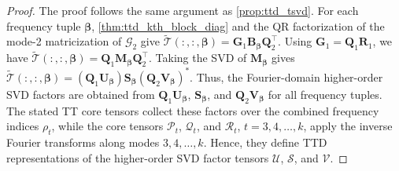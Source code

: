 \documentclass[onefignum,onetabnum]{siamart250211}
\begin{document}
\begin{proof}
The proof follows the same argument as \cref{prop:ttd_tsvd}.
For each frequency tuple $\boldsymbol{\beta}$, \cref{thm:ttd_kth_block_diag}
and the QR factorization of the mode-2 matricization of $\mathscr{G}_2$ give
$\widetilde{\mathscr{T}}(:,:, \boldsymbol{\beta})
=
\textbf{G}_1\textbf{B}_{\boldsymbol{\beta}}\textbf{Q}_2^\top.$
Using $\textbf{G}_1=\textbf{Q}_1\textbf{R}_1$, we have $\widetilde{\mathscr{T}}(:,:, \boldsymbol{\beta})
=
\textbf{Q}_1\textbf{M}_{\boldsymbol{\beta}}\textbf{Q}_2^\top.$
Taking the SVD of $\textbf{M}_{\boldsymbol{\beta}}$ gives $\widetilde{\mathscr{T}}(:,:, \boldsymbol{\beta})
=
(\textbf{Q}_1\textbf{U}_{\boldsymbol{\beta}})
\boldsymbol{S}_{\boldsymbol{\beta}}
(\textbf{Q}_2\textbf{V}_{\boldsymbol{\beta}})^*.$
Thus, the Fourier-domain higher-order SVD factors are obtained from
$\textbf{Q}_1\textbf{U}_{\boldsymbol{\beta}}$,
$\boldsymbol{S}_{\boldsymbol{\beta}}$, and
$\textbf{Q}_2\textbf{V}_{\boldsymbol{\beta}}$ for all frequency tuples. The stated TT core tensors collect these factors over the combined frequency indices $\rho_t$, while the core tensors $\mathscr{P}_t$, $\mathscr{Q}_t$, and $\mathscr{R}_t$, $t=3,4,\dots,k$, apply the inverse Fourier transforms along modes $3, 4, \dots,k$. Hence, they define TTD representations of the higher-order SVD factor tensors $\mathscr{U}$, $\mathscr{S}$, and $\mathscr{V}$.
\end{proof}
\end{document}
